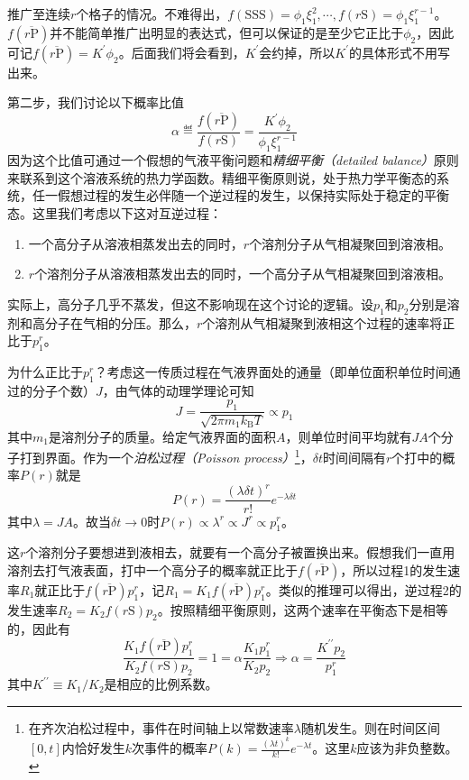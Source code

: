 \documentclass[main.tex]{subfiles}
\begin{document}
推广至连续$r$个格子的情况。不难得出，$f\left(\text{SSS}\right)=\phi_1\xi_1^2,\cdots,f\left(r\text{S}\right)=\phi_1\xi_1^{r-1}$。$f\left(\overline{r\text{P}}\right)$并不能简单推广出明显的表达式，但可以保证的是至少它正比于$\phi_2$，因此可记$f\left(\overline{r\text{P}}\right)=K^\prime\phi_2$。后面我们将会看到，$K^\prime$会约掉，所以$K^\prime$的具体形式不用写出来。

第二步，我们讨论以下概率比值
\[\alpha\eqdef\frac{f\left(\overline{r\text{P}}\right)}{f\left(r\text{S}\right)}=\frac{K^\prime\phi_2}{\phi_1\xi_1^{r-1}}\]
因为这个比值可通过一个假想的气液平衡问题和\emph{精细平衡（detailed balance）}原则来联系到这个溶液系统的热力学函数。精细平衡原则说，处于热力学平衡态的系统，任一假想过程的发生必伴随一个逆过程的发生，以保持实际处于稳定的平衡态。这里我们考虑以下这对互逆过程：
\begin{enumerate}
  \item 一个高分子从溶液相蒸发出去的同时，$r$个溶剂分子从气相凝聚回到溶液相。
  \item $r$个溶剂分子从溶液相蒸发出去的同时，一个高分子从气相凝聚回到溶液相。
\end{enumerate}
实际上，高分子几乎不蒸发，但这不影响现在这个讨论的逻辑。设$p_1$和$p_2$分别是溶剂和高分子在气相的分压。那么，$r$个溶剂从气相凝聚到液相这个过程的速率将正比于$p_1^r$。

为什么正比于$p_1^r$？考虑这一传质过程在气液界面处的通量（即单位面积单位时间通过的分子个数）$J$，由气体的动理学理论可知
\[J=\frac{p_1}{\sqrt{2\pi m_1 k_\text{B}T}}\propto p_1\]
其中$m_1$是溶剂分子的质量。给定气液界面的面积$A$，则单位时间平均就有$JA$个分子打到界面。作为一个\emph{泊松过程（Poisson process）}\footnote{在齐次泊松过程中，事件在时间轴上以常数速率$\lambda$随机发生。则在时间区间$\left[0,t\right]$内恰好发生$k$次事件的概率$P\left(k\right)=\frac{\left(\lambda t\right)^k}{k!}e^{-\lambda t}$。这里$k$应该为非负整数。}，$\delta t$时间间隔有$r$个打中的概率$P\left(r\right)$就是
\[P\left(r\right)=\frac{\left(\lambda\delta t\right)^r}{r!}e^{-\lambda\delta t}\]
其中$\lambda=JA$。故当$\delta t\to 0$时$P\left(r\right)\propto\lambda^r\propto J^r\propto p_1^r$。

这$r$个溶剂分子要想进到液相去，就要有一个高分子被置换出来。假想我们一直用溶剂去打气液表面，打中一个高分子的概率就正比于$f\left(\overline{r\text{P}}\right)$，所以过程1的发生速率$R_1$就正比于$f\left(\overline{r\text{P}}\right)p_1^r$，记$R_1=K_1f\left(\overline{r\text{P}}\right)p_1^r$。类似的推理可以得出，逆过程2的发生速率$R_2=K_2f\left(r\text{S}\right)p_2$。按照精细平衡原则，这两个速率在平衡态下是相等的，因此有
\[\frac{K_1f\left(\overline{r\text{P}}\right)p_1^r}{K_2f\left(r\text{S}\right)p_2}=1=\alpha\frac{K_1p_1^r}{K_2p_2}\Rightarrow\alpha=\frac{K^{\prime\prime}p_2}{p_1^r}\]
其中$K^{\prime\prime}\equiv K_1/K_2$是相应的比例系数。
\end{document}

